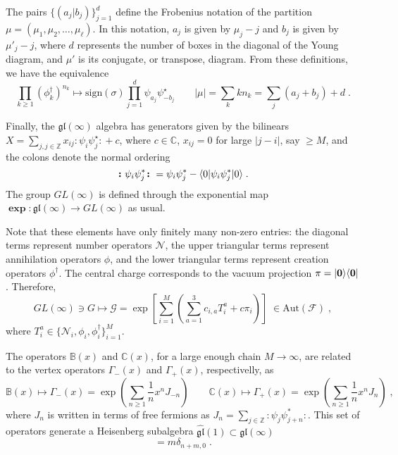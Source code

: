 \documentclass[a4paper,11pt]{amsart}
\begin{document}
The pairs \(\{(a_j|b_j)\}_{j=1}^d\) define the Frobenius notation of
the partition \(\mu = (\mu_1, \mu_2, \dots, \mu_\ell)\). In this
notation, \(a_j\) is given by \(\mu_j - j\) and \(b_j\) is given by
\(\mu'_j - j\), where \(d\) represents the number of boxes in the
diagonal of the Young diagram, and \(\mu'\) is its conjugate, or
transpose, diagram. From these definitions, we have the equivalence
\begin{equation}
  \prod_{k\geq 1} (\phi_k^\dagger)^{n_k} \mapsto \textrm{sign}(\sigma) \prod_{j=1}^d
  \psi_{a_j} \psi^\star_{-b_j} \qquad |\mu| = \sum_k k n_k = \sum_j(a_j + b_j) + d\; .
\end{equation}

Finally, the \(\mathfrak{gl}(\infty)\) algebra has generators given by the
bilinears \(X = \sum_{j, j \in \mathbb{Z}} x_{ij} \bm{\colon} \psi_i \psi_j^\star\bm{\colon}
+ c\), where \(c\in \mathbb{C}\), \(x_{ij} =
0\) for large \(|j -i|\), say \(\geq M\), and the colons denote the normal ordering
\begin{equation}
  \bm{\colon} \psi_i \psi_j^\ast \bm{\colon} =  \psi_i \psi_j^\ast
  - \langle0\rvert \psi_i \psi_j^\ast \lvert0\rangle \; .
\end{equation}
The group \(GL(\infty)\) is defined through the exponential map
\(\bm{\exp}: \mathfrak{gl}(\infty) \to GL(\infty)\) as usual.

Note that these elements have only finitely many non-zero entries: the
diagonal terms represent number operators \(\mathcal{N}\), the upper
triangular terms represent annihilation operators \(\phi\), and the
lower triangular terms represent creation operators
\(\phi^\dagger\). The central charge corresponds to the vacuum
projection \(\pi = \lvert\bm{0}\rangle\langle\bm{0}\rvert\).  Therefore,
\begin{equation}
   GL(\infty) \ni G \mapsto
   \mathcal{G} = \exp \left[\sum_{i=1}^M \left( \sum_{a=1}^3
   c_{i, a} T_i^{a}  + c \pi_i \right)\right] \; \in  \mathrm{Aut}(\mathcal{F})\; ,
\end{equation}
where \(T^{a}_i \in \{ \mathcal{N}_i, \phi_i, \phi_i^\dagger \}_{i=1}^M\). 

The operators \(\mathbb{B}(x)\) and \(\mathbb{C}(x)\), 
for a large enough chain \(M\to \infty\),
are related to the vertex operators
\(\Gamma_-(x)\) and \(\Gamma_+(x)\), respectivelly, as
\begin{equation}
    \mathbb{B}(x) \mapsto \Gamma_-(x)  = \exp \left( \sum_{n\geq 1} \frac{1}{n}x^n J_{-n}\right) \qquad 
    \mathbb{C}(x) \mapsto \Gamma_+(x)  = \exp \left( \sum_{n\geq 1} \frac{1}{n}x^n J_{n}\right) \; ,
\end{equation}
where \(J_n \) is written in terms of free fermions as \(J_n =
\sum_{j\in \mathbb{Z}} \bm{\colon} \psi_j \psi_{j+n}^\ast
\bm{\colon}\). This set of operators generate a Heisenberg subalgebra
\(\widehat{\mathfrak{gl}}(1) \subset \mathfrak{gl}(\infty)\)
\begin{equation}
  [J_m, J_n] = m \delta_{n+m,0}\; .
\end{equation}
\end{document}

